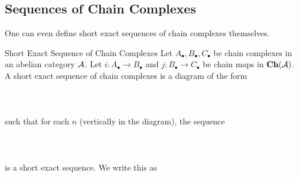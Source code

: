 \documentclass[a4paper]{article}
\begin{document}
\subsection{Sequences of Chain Complexes}
One can even define short exact sequences of chain complexes themselves. 

\begin{defn}{Short Exact Sequence of Chain Complexes}{} Let $A_\bullet,B_\bullet,C_\bullet$ be chain complexes in an abelian category $\mathcal{A}$. Let $i:A_\bullet\to B_\bullet$ and $j:B_\bullet\to C_\bullet$ be chain maps in $\bold{Ch}(\mathcal{A})$. A short exact sequence of chain complexes is a diagram of the form \\~\\
\\~\\
such that for each $n$ (vertically in the diagram), the sequence \\~\\
\\~\\ is a short exact sequence. We write this as \\~\\
\end{defn}
\end{document}
